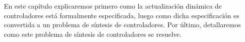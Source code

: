 En este capítulo explicaremos primero como la actualización dinámica de controladores está formalmente especificada,
luego como dicha especificación es convertida a un problema de síntesis de controladores. Por último, detallaremos como
este problema de síntesis de controladores se resuelve.

